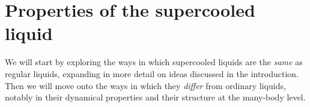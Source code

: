 \documentclass[11pt,twoside]{report}
\begin{document}


\section{Properties of the supercooled liquid}
\label{sec:glass-phenomenology}

We will start by exploring the ways in which supercooled liquids are the \emph{same} as regular liquids, expanding in more detail on ideas discussed in the introduction.
Then we will move onto the ways in which they \emph{differ} from ordinary liquids, notably in their dynamical properties and their structure at the many-body level.
\end{document}
